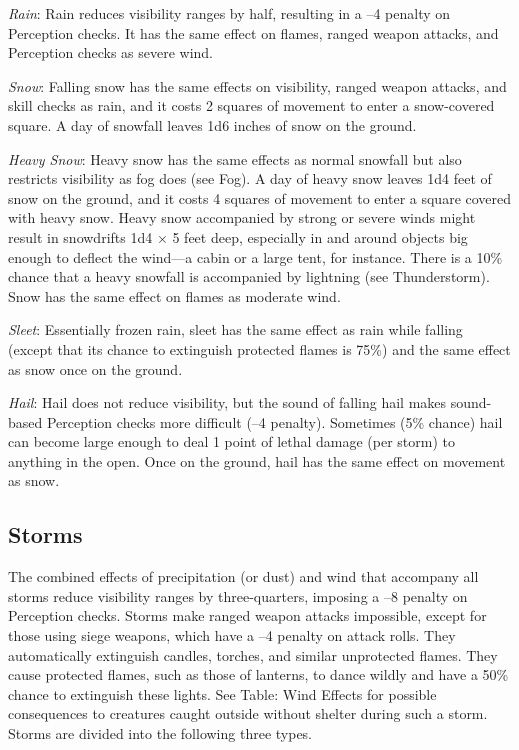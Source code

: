 \textit{Rain}: Rain reduces visibility ranges by half, resulting in a --4 penalty on Perception checks. It has the same effect on flames, ranged weapon attacks, and Perception checks as severe wind.
				
\textit{Snow}: Falling snow has the same effects on visibility, ranged weapon attacks, and skill checks as rain, and it costs 2 squares of movement to enter a snow-covered square. A day of snowfall leaves 1d6 inches of snow on the ground.
				
\textit{Heavy Snow}: Heavy snow has the same effects as normal snowfall but also restricts visibility as fog does (see Fog). A day of heavy snow leaves 1d4 feet of snow on the ground, and it costs 4 squares of movement to enter a square covered with heavy snow. Heavy snow accompanied by strong or severe winds might result in snowdrifts 1d4 \mbox{$\times$} 5 feet deep, especially in and around objects big enough to deflect the wind---a cabin or a large tent, for instance. There is a 10\% chance that a heavy snowfall is accompanied by lightning (see Thunderstorm). Snow has the same effect on flames as moderate wind.
				
\textit{Sleet}: Essentially frozen rain, sleet has the same effect as rain while falling (except that its chance to extinguish protected flames is 75\%) and the same effect as snow once on the ground. 
				
\textit{Hail}: Hail does not reduce visibility, but the sound of falling hail makes sound-based Perception checks more difficult (--4 penalty). Sometimes (5\% chance) hail can become large enough to deal 1 point of lethal damage (per storm) to anything in the open. Once on the ground, hail has the same effect on movement as snow.
				
\subsection{Storms}

				
The combined effects of precipitation (or dust) and wind that accompany all storms reduce visibility ranges by three-quarters, imposing a --8 penalty on Perception checks. Storms make ranged weapon attacks impossible, except for those using siege weapons, which have a --4 penalty on attack rolls. They automatically extinguish candles, torches, and similar unprotected flames. They cause protected flames, such as those of lanterns, to dance wildly and have a 50\% chance to extinguish these lights. See Table: Wind Effects for possible consequences to creatures caught outside without shelter during such a storm. Storms are divided into the following three types. 
				
